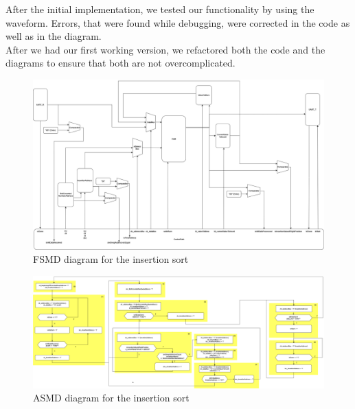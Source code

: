 \documentclass[conference]{IEEEtran}
\begin{document}
After the initial implementation, we tested our functionality by using the waveform. Errors, that were found while debugging, were corrected in the code as well as in the diagram.\\
After we had our first working version, we refactored both the code and the diagrams to ensure that both are not overcomplicated. 
\begin{figure}
    \centering
    \includegraphics[width=1\linewidth]{Images/FSMDInsertionSort.png}
    \caption{FSMD diagram for the insertion sort}\label{fig:fsmd}
\end{figure}
\begin{figure}
    \centering
    \includegraphics[width=1\linewidth]{Images/ASMDInsertionSort.png}
    \caption{ASMD diagram for the insertion sort}\label{fig:asmd}
\end{figure}
\end{document}
